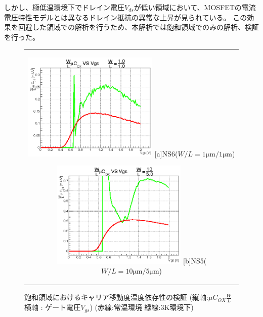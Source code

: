 			しかし、極低温環境下でドレイン電圧$V_{ds}$が低い領域において、MOSFETの電流電圧特性モデルとは異なるドレイン抵抗の異常な上昇が見られている。
			この効果を回避した領域での解析を行うため、本解析では飽和領域でのみの解析、検証を行った。
			
			\begin{figure}[htbp]
				\begin{center}
					\begin{tabular}{c}
						\begin{minipage}{0.5\hsize}
							\begin{center}
								\includegraphics[clip, width=6.5cm]{./Chapter/Appendix/Picture/NST/mu_analysis/mu_NS6.eps}
								\hspace{1.6cm} [a]NS6($W/L = 1\mathrm{\mu m}/1\mathrm{\mu m}$)
							\end{center}
						\end{minipage}
						\begin{minipage}{0.5\hsize}
							\begin{center}
								\includegraphics[clip, width=6.5cm]{./Chapter/Appendix/Picture/NST/mu_analysis/mu_NS5.eps}
								\hspace{1.6cm} [b]NS5($W/L = 10\mathrm{\mu m}/5\mathrm{\mu m}$)
							\end{center}
						\end{minipage}
					\end{tabular}
					\caption{飽和領域におけるキャリア移動度温度依存性の検証 \newline 
						(縦軸:$\mu C_{OX} \frac{W}{L}$ 横軸 : ゲート電圧$V_{gs}$)  (赤線:常温環境 緑線:3K環境下)}
					\label{fig:mu_analysis}
				\end{center}
			\end{figure}
			
